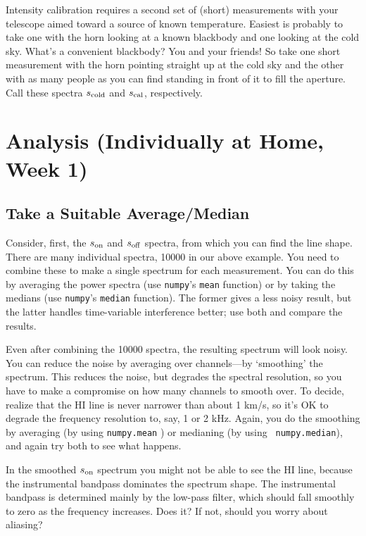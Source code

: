 \documentclass[11pt,preprint]{aastex}
\begin{document}
\noindent
Intensity calibration requires a second set of (short) measurements
  with your telescope aimed toward a source of known temperature.
  Easiest is probably to take one with the horn
  looking at a known blackbody and one looking at the cold sky. What's a
  convenient blackbody? You and your friends! So take one short
  measurement with the horn pointing straight up at the cold sky and the
  other with as many people as you can find standing in front of it to
  fill the aperture. Call these spectra
  $s_{\rm cold}$ and $s_{\rm cal}$, respectively.


\section{Analysis (Individually at Home, Week 1)} \label{analysis}

\subsection{Take a Suitable Average/Median}

\noindent
Consider, first, the $s_{\rm on}$ and $s_{\rm off}$ spectra, from which
you can find the line shape. There are many individual spectra, 10000 in
our above example. You need to combine these to make a single spectrum
for each measurement. You can do this by averaging the power spectra
(use {\tt numpy}'s {\tt mean} function) or by taking the medians (use {\tt numpy}'s
{\tt median} function). The former gives a less noisy result, but the
latter handles time-variable interference better; use both and compare
the results.

Even after combining the 10000 spectra, the resulting
spectrum will look noisy.  You can reduce the noise by averaging
over channels---by `smoothing' the spectrum. This reduces the noise, but
degrades the spectral resolution, so you have to make a compromise on
how many channels to smooth over. To decide, realize that the HI line is
never narrower than about 1 km/s, so it's OK to degrade the frequency
resolution to, say, 1 or 2 kHz. Again, you do the smoothing by averaging
(by using {\tt numpy.mean} ) or medianing (by using {\tt
  numpy.median}), and again try both to see what happens.

In the smoothed $s_{\rm on}$ spectrum you might not be able to see the
HI line, because the instrumental bandpass dominates the spectrum
shape. The instrumental bandpass is determined mainly by the low-pass
filter, which should fall smoothly to zero as the frequency
increases. Does it? If not, should you worry about aliasing?
\end{document}
